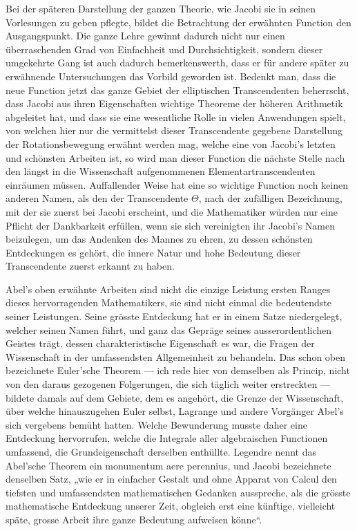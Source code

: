 \documentclass[11pt]{article}
\begin{document}
Bei der späteren Darstellung der ganzen Theorie, wie Jacobi sie in seinen Vorlesungen zu geben pflegte, bildet die Betrachtung der erwähnten Function den Ausgangspunkt. Die ganze Lehre gewinnt dadurch nicht nur einen überraschenden Grad von Einfachheit und Durchsichtigkeit, sondern dieser umgekehrte Gang ist auch dadurch bemerkenswerth, dass er für andere später zu erwähnende Untersuchungen das Vorbild geworden ist. Bedenkt man, dass die neue Function jetzt das ganze Gebiet der elliptischen Transcendenten beherrscht, dass Jacobi aus ihren Eigenschaften wichtige Theoreme der höheren Arithmetik abgeleitet hat, und dass sie eine wesentliche Rolle in vielen Anwendungen spielt, von welchen hier nur die vermittelst dieser Transcendente gegebene Darstellung der Rotationsbewegung erwähnt werden mag, welche eine von Jacobi’s letzten und schönsten Arbeiten ist, so wird man dieser Function die nächste Stelle nach den längst in die Wissenschaft aufgenommenen Elementartranscendenten einräumen müssen. Auffallender Weise hat eine so wichtige Function noch keinen anderen Namen, als den der Transcendente $\Theta$, nach der zufälligen Bezeichnung, mit der sie zuerst bei Jacobi erscheint, und die Mathematiker würden nur eine Pflicht der Dankbarkeit erfüllen, wenn sie sich vereinigten ihr Jacobi’s Namen beizulegen, um das Andenken des Mannes zu ehren, zu dessen schönsten Entdeckungen es gehört, die innere Natur und hohe Bedeutung dieser Transcendente zuerst erkannt zu haben.

Abel’s oben erwähnte Arbeiten sind nicht die einzige Leistung ersten Ranges dieses hervorragenden Mathematikers, sie sind nicht einmal die bedeutendste seiner Leistungen. Seine grösste Entdeckung hat er in einem Satze niedergelegt, welcher seinen Namen führt, und ganz das Gepräge seines ausserordentlichen Geistes trägt, dessen charakteristische Eigenschaft es war, die Fragen der Wissenschaft in der umfassendsten Allgemeinheit zu behandeln. Das schon oben bezeichnete Euler’sche Theorem — ich rede hier von demselben als Princip, nicht von den daraus gezogenen Folgerungen, die sich täglich weiter erstreckten — bildete damals auf dem Gebiete, dem es angehört, die Grenze der Wissenschaft, über welche hinauszugehen Euler selbst, Lagrange und andere Vorgänger Abel’s sich vergebens bemüht hatten. Welche Bewunderung musste daher eine Entdeckung hervorrufen, welche die Integrale aller algebraischen Functionen umfassend, die Grundeigenschaft derselben enthüllte. Legendre nennt das Abel’sche Theorem ein monumentum aere perennius, und Jacobi bezeichnete denselben Satz, „wie er in einfacher Gestalt und ohne Apparat von Calcul den tiefsten und umfassendsten mathematischen Gedanken ausspreche, als die grösste mathematische Entdeckung unserer Zeit, obgleich erst eine künftige, vielleicht späte, grosse Arbeit ihre ganze Bedeutung aufweisen könne“.
\end{document}
